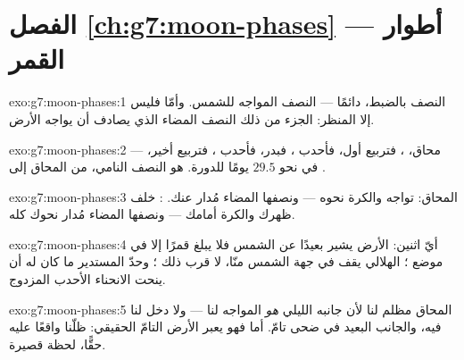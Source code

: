 \section*{الفصل \ref{ch:g7:moon-phases} --- أطوار القمر}

\begin{solution}{exo:g7:moon-phases:1}
النصف بالضبط، دائمًا --- النصف المواجه للشمس. وأمّا  فليس
إلا المنظر: الجزء من ذلك النصف المضاء الذي يصادف أن يواجه
الأرض.
\end{solution}

\begin{solution}{exo:g7:moon-phases:2}
محاق،  ، فتربيع أول، فأحدب ، فبدر، فأحدب
، فتربيع أخير،   --- في نحو $29.5$ يومًا
للدورة.  هو النصف النامي، من المحاق إلى .
\end{solution}

\begin{solution}{exo:g7:moon-phases:3}
المحاق: تواجه  والكرة نحوه --- ونصفها المضاء مُدار عنك.
:  خلف ظهرك والكرة أمامك --- ونصفها المضاء مُدار
نحوك كله.
\end{solution}

\begin{solution}{exo:g7:moon-phases:4}
أيّ اثنين:  الأرض يشير بعيدًا عن الشمس فلا يبلغ قمرًا إلا في
موضع ؛  الهلالي يقف في جهة الشمس منّا، لا قرب ذلك
؛ وحدّ  المستدير ما كان له أن ينحت الانحناء الأحدب
المزدوج.
\end{solution}

\begin{solution}{exo:g7:moon-phases:5}
المحاق مظلم لنا لأن جانبه الليلي \emph{هو} المواجه لنا --- ولا
دخل  لنا فيه، والجانب البعيد في ضحى تامّ. أما  فهو
 يعبر  الأرض التامّ الحقيقي: ظلّنا واقعًا عليه حقًّا،
لحظة قصيرة.
\end{solution}

